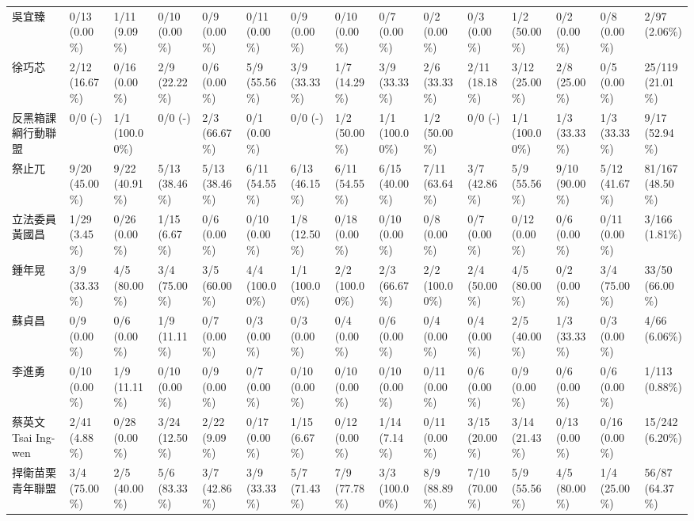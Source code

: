 \documentclass[letterpaper, 10pt, conference]{ieeeconf}   %
\begin{document}
\begin{CJK}{UTF8}{bsmi}
\begin{landscape}
\begin{longtable}[c]{@{}L{2.45cm}L{1.1cm}L{1.1cm}L{1.1cm}L{1.1cm}L{1.1cm}L{1.1cm}L{1.1cm}L{1.1cm}L{1.1cm}L{1.1cm}L{1.1cm}L{1.1cm}L{1.1cm}L{1.1cm}@{}}
吳宜臻 & 0/13 (0.00\%) & 1/11 (9.09\%) & 0/10 (0.00\%) & 0/9 (0.00\%) & 0/11 (0.00\%) & 0/9 (0.00\%) & 0/10 (0.00\%) & 0/7 (0.00\%) & 0/2 (0.00\%) & 0/3 (0.00\%) & 1/2 (50.00\%) & 0/2 (0.00\%) & 0/8 (0.00\%) & 2/97 (2.06\%) \\
徐巧芯 & 2/12 (16.67\%) & 0/16 (0.00\%) & 2/9 (22.22\%) & 0/6 (0.00\%) & 5/9 (55.56\%) & 3/9 (33.33\%) & 1/7 (14.29\%) & 3/9 (33.33\%) & 2/6 (33.33\%) & 2/11 (18.18\%) & 3/12 (25.00\%) & 2/8 (25.00\%) & 0/5 (0.00\%) & 25/119 (21.01\%) \\
反黑箱課綱行動聯盟 & 0/0 (-) & 1/1 (100.00\%) & 0/0 (-) & 2/3 (66.67\%) & 0/1 (0.00\%) & 0/0 (-) & 1/2 (50.00\%) & 1/1 (100.00\%) & 1/2 (50.00\%) & 0/0 (-) & 1/1 (100.00\%) & 1/3 (33.33\%) & 1/3 (33.33\%) & 9/17 (52.94\%) \\
祭止兀 & 9/20 (45.00\%) & 9/22 (40.91\%) & 5/13 (38.46\%) & 5/13 (38.46\%) & 6/11 (54.55\%) & 6/13 (46.15\%) & 6/11 (54.55\%) & 6/15 (40.00\%) & 7/11 (63.64\%) & 3/7 (42.86\%) & 5/9 (55.56\%) & 9/10 (90.00\%) & 5/12 (41.67\%) & 81/167 (48.50\%) \\
立法委員 黃國昌 & 1/29 (3.45\%) & 0/26 (0.00\%) & 1/15 (6.67\%) & 0/6 (0.00\%) & 0/10 (0.00\%) & 1/8 (12.50\%) & 0/18 (0.00\%) & 0/10 (0.00\%) & 0/8 (0.00\%) & 0/7 (0.00\%) & 0/12 (0.00\%) & 0/6 (0.00\%) & 0/11 (0.00\%) & 3/166 (1.81\%) \\
鍾年晃 & 3/9 (33.33\%) & 4/5 (80.00\%) & 3/4 (75.00\%) & 3/5 (60.00\%) & 4/4 (100.00\%) & 1/1 (100.00\%) & 2/2 (100.00\%) & 2/3 (66.67\%) & 2/2 (100.00\%) & 2/4 (50.00\%) & 4/5 (80.00\%) & 0/2 (0.00\%) & 3/4 (75.00\%) & 33/50 (66.00\%) \\
蘇貞昌 & 0/9 (0.00\%) & 0/6 (0.00\%) & 1/9 (11.11\%) & 0/7 (0.00\%) & 0/3 (0.00\%) & 0/3 (0.00\%) & 0/4 (0.00\%) & 0/6 (0.00\%) & 0/4 (0.00\%) & 0/4 (0.00\%) & 2/5 (40.00\%) & 1/3 (33.33\%) & 0/3 (0.00\%) & 4/66 (6.06\%) \\
李進勇 & 0/10 (0.00\%) & 1/9 (11.11\%) & 0/10 (0.00\%) & 0/9 (0.00\%) & 0/7 (0.00\%) & 0/10 (0.00\%) & 0/10 (0.00\%) & 0/10 (0.00\%) & 0/11 (0.00\%) & 0/6 (0.00\%) & 0/9 (0.00\%) & 0/6 (0.00\%) & 0/6 (0.00\%) & 1/113 (0.88\%) \\
蔡英文 Tsai Ing-wen & 2/41 (4.88\%) & 0/28 (0.00\%) & 3/24 (12.50\%) & 2/22 (9.09\%) & 0/17 (0.00\%) & 1/15 (6.67\%) & 0/12 (0.00\%) & 1/14 (7.14\%) & 0/11 (0.00\%) & 3/15 (20.00\%) & 3/14 (21.43\%) & 0/13 (0.00\%) & 0/16 (0.00\%) & 15/242 (6.20\%) \\
捍衛苗栗青年聯盟 & 3/4 (75.00\%) & 2/5 (40.00\%) & 5/6 (83.33\%) & 3/7 (42.86\%) & 3/9 (33.33\%) & 5/7 (71.43\%) & 7/9 (77.78\%) & 3/3 (100.00\%) & 8/9 (88.89\%) & 7/10 (70.00\%) & 5/9 (55.56\%) & 4/5 (80.00\%) & 1/4 (25.00\%) & 56/87 (64.37\%) \\

\end{longtable}
\end{landscape}
\end{CJK}
\end{document}
